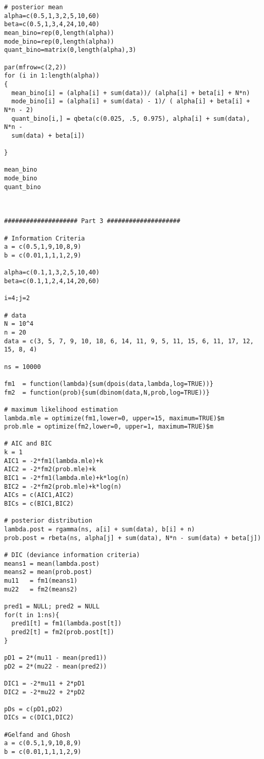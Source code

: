 \documentclass[a4paper, 11pt]{article}
\begin{document}
\begin{verbatim}
# posterior mean 
alpha=c(0.5,1,3,2,5,10,60)
beta=c(0.5,1,3,4,24,10,40)
mean_bino=rep(0,length(alpha))
mode_bino=rep(0,length(alpha))
quant_bino=matrix(0,length(alpha),3)

par(mfrow=c(2,2))
for (i in 1:length(alpha))
{
  mean_bino[i] = (alpha[i] + sum(data))/ (alpha[i] + beta[i] + N*n)
  mode_bino[i] = (alpha[i] + sum(data) - 1)/ ( alpha[i] + beta[i] + N*n - 2)
  quant_bino[i,] = qbeta(c(0.025, .5, 0.975), alpha[i] + sum(data), N*n - 
  sum(data) + beta[i])
  
}

mean_bino
mode_bino
quant_bino



#################### Part 3 ####################

# Information Criteria
a = c(0.5,1,9,10,8,9)
b = c(0.01,1,1,1,2,9)

alpha=c(0.1,1,3,2,5,10,40)
beta=c(0.1,1,2,4,14,20,60)

i=4;j=2

# data
N = 10^4
n = 20
data = c(3, 5, 7, 9, 10, 18, 6, 14, 11, 9, 5, 11, 15, 6, 11, 17, 12, 15, 8, 4)

ns = 10000

fm1  = function(lambda){sum(dpois(data,lambda,log=TRUE))}
fm2  = function(prob){sum(dbinom(data,N,prob,log=TRUE))}

# maximum likelihood estimation
lambda.mle = optimize(fm1,lower=0, upper=15, maximum=TRUE)$m
prob.mle = optimize(fm2,lower=0, upper=1, maximum=TRUE)$m

# AIC and BIC
k = 1
AIC1 = -2*fm1(lambda.mle)+k
AIC2 = -2*fm2(prob.mle)+k
BIC1 = -2*fm1(lambda.mle)+k*log(n)
BIC2 = -2*fm2(prob.mle)+k*log(n)
AICs = c(AIC1,AIC2)
BICs = c(BIC1,BIC2)

# posterior distribution
lambda.post = rgamma(ns, a[i] + sum(data), b[i] + n)
prob.post = rbeta(ns, alpha[j] + sum(data), N*n - sum(data) + beta[j])

# DIC (deviance information criteria)
means1 = mean(lambda.post)
means2 = mean(prob.post)
mu11   = fm1(means1)
mu22   = fm2(means2)

pred1 = NULL; pred2 = NULL
for(t in 1:ns){
  pred1[t] = fm1(lambda.post[t])
  pred2[t] = fm2(prob.post[t])
}

pD1 = 2*(mu11 - mean(pred1)) 
pD2 = 2*(mu22 - mean(pred2))

DIC1 = -2*mu11 + 2*pD1  
DIC2 = -2*mu22 + 2*pD2 

pDs = c(pD1,pD2)
DICs = c(DIC1,DIC2)

#Gelfand and Ghosh
a = c(0.5,1,9,10,8,9)
b = c(0.01,1,1,1,2,9)


\end{verbatim}
\end{document}
